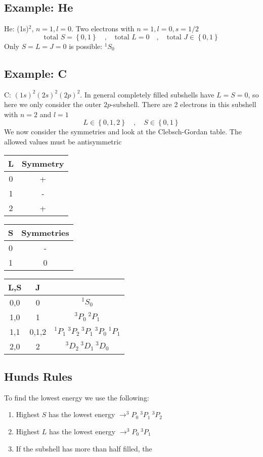 \documentclass{article}
\begin{document}
\subsection*{Example: He}
He: (1s)$^2$, $n = 1, l = 0$. Two electrons with $n=1, l=0, s=1 /2$ 
\[
\text{total } S = \left\{0,1\right\} \quad , \quad \text{total } L = 0 \quad , \quad \text{total } J ∈ \left\{0,1\right\} 
\]
Only $S = L = J = 0$ is possible: $^{1}S_{0}$

\subsection*{Example: C}
C: $(1s)^2 (2s)^2 (2p)^2$. In general completely filled subshells have $L = S = 0$, so here we only consider the outer $2p$-subshell. There are 2 electrons in  this subshell with $n=2$ and $l=1$
\[
L ∈ \left\{0,1,2\right\} \quad , \quad S ∈ \left\{0,1\right\}
\]
We now consider the symmetries and look at the Clebsch-Gordan table. 
The allowed values must be antisymmetric

\begin{tabular}[t]{ c|c }
L &Symmetry \\
\hline
0 &+ \\
1 &- \\
2 &+ \\
\hline
\end{tabular}\hspace{10pt}
\begin{tabular}[t]{ c|c }
S &Symmetries \\
\hline
0 &- \\
1 &0 \\
\hline
\end{tabular}\hspace{10pt}
\begin{tabular}[t]{ c|c|c }
L,S &J & \\
\hline
0,0 &0 & $^1S_0$\\
1,0 &1 & $^3P_0\ ^2P_1$\\
1,1 &0,1,2 & $^1P_1\ ^3P_2\ ^3P_1\ ^3P_0\ ^1P_1$\\
2,0 &2 & $^3D_2\ ^3D_1\ ^3D_0$\\
\end{tabular}

\subsection*{Hunds Rules}
To find the lowest energy we use the following:
\begin{enumerate}
    \item Highest $S$ has the lowest energy  $ → ^3P_{0}\ ^3P_{1}\ ^3P_2$
    \item Highest $L$ has the lowest energy $ → ^3P_0\ ^3P_1\ $
    \item If the subshell has more than half filled, the 
\end{enumerate}
\end{document}
